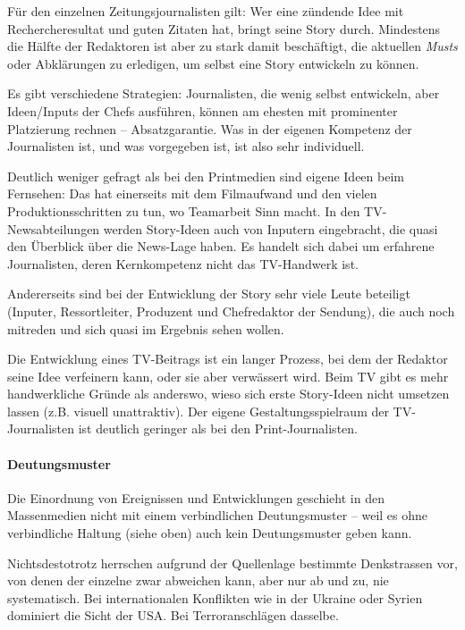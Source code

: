 Für den einzelnen Zeitungsjournalisten gilt: Wer eine zündende Idee mit
Rechercheresultat und guten Zitaten hat, bringt seine Story durch.
Mindestens die Hälfte der Redaktoren ist aber zu stark damit
beschäf­tigt, die aktuellen \emph{Musts} oder Abklärungen zu erledigen,
um selbst eine Story entwickeln zu können.

Es gibt verschiedene Strategien: Journalisten, die wenig selbst
entwickeln, aber Ideen/Inputs der Chefs ausführen, können am ehesten mit
prominenter Platzierung rechnen -- Absatzgarantie. Was in der eigenen
Kompetenz der Journalisten ist, und was vorgegeben ist, ist also sehr
individuell.

Deutlich weniger gefragt als bei den Printmedien sind eigene Ideen beim
Fernsehen: Das hat einerseits mit dem Filmaufwand und den vielen
Produktionsschritten zu tun, wo Teamarbeit Sinn macht. In den
TV-Newsabteilungen werden Story-Ideen auch von Inputern eingebracht, die
quasi den Überblick über die News-Lage haben. Es handelt sich dabei um
erfahrene Journalisten, deren Kernkompetenz nicht das TV-Handwerk ist.

Andererseits sind bei der Entwicklung der Story sehr viele Leute
beteiligt (Inputer, Ressortleiter, Produzent und Chefredaktor der
Sendung), die auch noch mitreden und sich quasi im Ergebnis sehen
wollen.

Die Entwicklung eines TV-Beitrags ist ein langer Prozess, bei dem der
Redaktor seine Idee verfeinern kann, oder sie aber verwässert wird. Beim
TV gibt es mehr handwerkliche Gründe als anderswo, wieso sich erste
Story-Ideen nicht umsetzen lassen (z.B. visuell unattraktiv). Der eigene
Gestaltungsspielraum der TV-Journalisten ist deutlich geringer als bei
den Print-Journalisten.

\hypertarget{deutungsmuster}{%
\paragraph{Deutungsmuster}\label{deutungsmuster}}

Die Einordnung von Ereignissen und Entwicklungen geschieht in den
Massenmedien nicht mit einem verbindlichen Deutungsmuster -- weil es
ohne verbindliche Haltung (siehe oben) auch kein Deutungs­muster geben
kann.

Nichtsdestotrotz herrschen aufgrund der Quellenlage bestimmte
Denkstrassen vor, von denen der einzelne zwar abweichen kann, aber nur
ab und zu, nie systematisch. Bei internationalen Konflikten wie in der
Ukraine oder Syrien dominiert die Sicht der USA. Bei Terroranschlägen
dasselbe.

